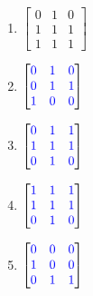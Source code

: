 \documentclass[sigconf]{acmart}
\newcommand{\answer}[2]{%
  \if\relax\detokenize{#2}\relax
    \underline{\mbox{請作答}}%
  \else
    \textcolor{blue}{#2}%
  \fi
}
\begin{document}
\begin{enumerate}[label=(\alph*)]
\item
    $
    \begin{bmatrix}
       0 & 1 & 0 \\
       1 & 1 & 1 \\
       1 & 1 & 1
    \end{bmatrix}
    $
    \item
    $
    \begin{bmatrix}
        \answer{9.3.14a1}{0}     & \answer{9.3.14a2}{1} & \answer{9.3.14a3}{0} \\
        \answer{9.3.14a4}{0}     & \answer{9.3.14a5}{1} & \answer{9.3.14a6}{1} \\
        \answer{9.3.14a7}{1}     & \answer{9.3.14a8}{0} & \answer{9.3.14a9}{0}
    \end{bmatrix}
    $
    \item
    $
    \begin{bmatrix}
        \answer{9.3.14b1}{0}     & \answer{9.3.14b2}{1} & \answer{9.3.14b3}{1} \\
        \answer{9.3.14b4}{1}     & \answer{9.3.14b5}{1} & \answer{9.3.14b6}{1} \\
        \answer{9.3.14b7}{0}     & \answer{9.3.14b8}{1} & \answer{9.3.14b9}{0}
    \end{bmatrix}
    $
    \item
    $
    \begin{bmatrix}
        \answer{9.3.14c1}{1}     & \answer{9.3.14c2}{1} & \answer{9.3.14c3}{1} \\
        \answer{9.3.14c4}{1}     & \answer{9.3.14c5}{1} & \answer{9.3.14c6}{1} \\
        \answer{9.3.14c7}{0}     & \answer{9.3.14c8}{1} & \answer{9.3.14c9}{0}
    \end{bmatrix}
    $
    \item
    $
    \begin{bmatrix}
        \answer{9.3.14d1}{0}     & \answer{9.3.14d2}{0} & \answer{9.3.14d3}{0} \\
        \answer{9.3.14d4}{1}     & \answer{9.3.14d5}{0} & \answer{9.3.14d6}{0} \\
        \answer{9.3.14d7}{0}     & \answer{9.3.14d8}{1} & \answer{9.3.14d9}{1}
    \end{bmatrix}
    $
\end{enumerate}
\end{document}
